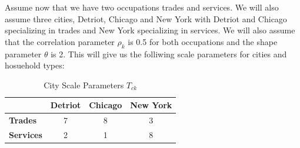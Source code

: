 \documentclass[10pt]{article}
\begin{document}
Assume now that we have two occupations trades and services. We will also assume three cities, Detriot, Chicago and New York with Detriot and Chicago specializing in trades and New York specializing in services. We will also assume that the correlation parameter $\rho_k$ is 0.5 for both occupations and the shape parameter $\theta$ is 2. This will give us the folliwing scale parameters for cities and hosuehold types:

\vspace{2em}


\begin{table}[h]
    \centering
    \begin{tabular}{|l|c|c|c|}
        \hline
                          & \textbf{Detriot} & \textbf{Chicago} & \textbf{New York} \\
        \hline
        \textbf{Trades}   & 7                & 8                & 3                 \\
        \hline
        \textbf{Services} & 2                & 1                & 8                 \\
        \hline
    \end{tabular}
    \caption{City Scale Parameters $T_{ck}$}
    \label{city_shifter}
\end{table}
\end{document}
